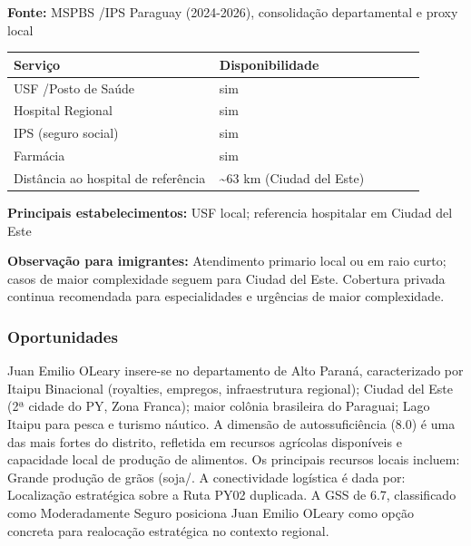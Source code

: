 \textbf{Fonte:} MSPBS /\allowbreak  IPS Paraguay (2024-2026), consolidação
departamental e proxy local

{\def\LTcaptype{none} %
\begin{longtable}{@{}>{\raggedright\arraybackslash}p{0.45\linewidth} >{\raggedright\arraybackslash}p{0.45\linewidth}@{}}
\toprule\noalign{}
Serviço & Disponibilidade \\
\midrule\noalign{}
\endhead
\bottomrule\noalign{}
\endlastfoot
USF /\allowbreak  Posto de Saúde & sim \\
Hospital Regional & sim \\
IPS (seguro social) & sim \\
Farmácia & sim \\
Distância ao hospital de referência & \textasciitilde63 km (Ciudad del
Este) \\
\end{longtable}
}

\textbf{Principais estabelecimentos:} USF local; referencia hospitalar
em Ciudad del Este

\textbf{Observação para imigrantes:} Atendimento primario local ou em
raio curto; casos de maior complexidade seguem para Ciudad del Este.
Cobertura privada continua recomendada para especialidades e urgências
de maior complexidade.
\newpage

\subsubsection*{Oportunidades}\label{oport-juan-emilio-oleary-1010}
Juan Emilio OLeary insere-se no departamento de Alto Paraná, caracterizado por Itaipu Binacional (royalties, empregos, infraestrutura regional); Ciudad del Este (2ª cidade do PY, Zona Franca); maior colônia brasileira do Paraguai; Lago Itaipu para pesca e turismo náutico. A dimensão de autossuficiência (8.0) é uma das mais fortes do distrito, refletida em recursos agrícolas disponíveis e capacidade local de produção de alimentos. Os principais recursos locais incluem: Grande produção de grãos (soja/. A conectividade logística é dada por: Localização estratégica sobre a Ruta PY02 duplicada. A GSS de 6.7, classificado como Moderadamente Seguro posiciona Juan Emilio OLeary como opção concreta para realocação estratégica no contexto regional.

